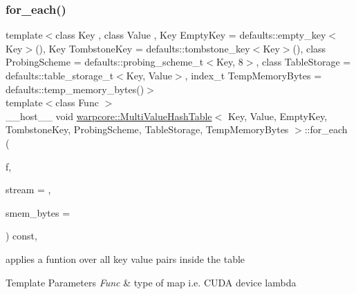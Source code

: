 \subsubsection{\texorpdfstring{for\+\_\+each()}{for\_each()}\hspace{0.1cm}{\footnotesize\ttfamily [2/3]}}
{\footnotesize\ttfamily template$<$class Key , class Value , Key Empty\+Key = defaults\+::empty\+\_\+key$<$\+Key$>$(), Key Tombstone\+Key = defaults\+::tombstone\+\_\+key$<$\+Key$>$(), class Probing\+Scheme  = defaults\+::probing\+\_\+scheme\+\_\+t$<$\+Key, 8$>$, class Table\+Storage  = defaults\+::table\+\_\+storage\+\_\+t$<$\+Key, Value$>$, index\+\_\+t Temp\+Memory\+Bytes = defaults\+::temp\+\_\+memory\+\_\+bytes()$>$ \\
template$<$class Func $>$ \\
\+\_\+\+\_\+host\+\_\+\+\_\+ void \hyperlink{classwarpcore_1_1MultiValueHashTable}{warpcore\+::\+Multi\+Value\+Hash\+Table}$<$ Key, Value, Empty\+Key, Tombstone\+Key, Probing\+Scheme, Table\+Storage, Temp\+Memory\+Bytes $>$\+::for\+\_\+each (\begin{DoxyParamCaption}\item[{Func}]{f,  }\item[{const cuda\+Stream\+\_\+t}]{stream = {},  }\item[{const index\+\_\+type}]{smem\+\_\+bytes = {} }\end{DoxyParamCaption}) const\hspace{0.3cm}{\ttfamily [inline]}, {\ttfamily [noexcept]}}



applies a funtion over all key value pairs inside the table 


\begin{DoxyTemplParams}{Template Parameters}
{\em Func} & type of map i.\+e. C\+U\+DA device lambda \\
\hline
\end{DoxyTemplParams}

